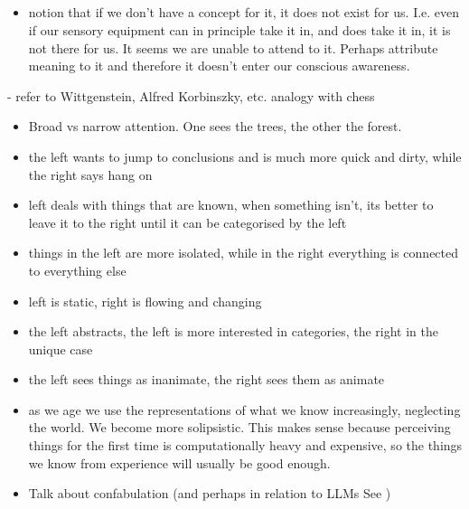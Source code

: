 



















\subsection{}
\begin{itemize}
    \item notion that if we don't have a concept for it, it does not exist for us. I.e. even if our sensory equipment can in principle take it in, and does take it in, it is not there for us. It seems we are unable to attend to it. Perhaps attribute meaning to it and therefore it doesn't enter our conscious awareness.
\end{itemize}

- refer to Wittgenstein, Alfred Korbinszky, etc. analogy with chess

\begin{itemize}
    \item Broad vs narrow attention. One sees the trees, the other the forest.
    \item the left wants to jump to conclusions and is much more quick and dirty, while the right says hang on
    \item left deals with things that are known, when something isn't, its better to leave it to the right until it can be categorised by the left
    \item things in the left are more isolated, while in the right everything is connected to everything else
    \item left is static, right is flowing and changing
    \item the left abstracts, the left is more interested in categories, the right in the unique case
    \item the left sees things as inanimate, the right sees them as animate
    \item as we age we use the representations of what we know increasingly, neglecting the world. We become more solipsistic. This makes sense because perceiving things for the first time is computationally heavy and expensive, so the things we know from experience will usually be good enough.
    \item Talk about confabulation (and perhaps in relation to LLMs See \cite{Smith_Greaves_Panch_2023}) 
\end{itemize}

